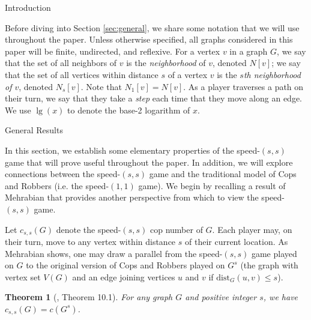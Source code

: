 \documentclass[12pt]{amsart}
\newcommand{\comment}[1]{\textcolor{red}{#1}}
\newtheorem{theorem}[lemma]{Theorem}
\theoremstyle{definition}
\newcommand{\speeds}{c_{s,s}}
\begin{document}
\begin{section}{Introduction}

Before diving into Section \ref{sec:general}, we share some notation that we will use throughout the paper.  Unless otherwise specified, all graphs considered in this paper will be finite, undirected, and reflexive.  For a vertex $v$ in a graph $G$, we say that the set of all neighbors of $v$ is the \textit{neighborhood} of $v$, denoted $N[v]$; we say that the set of all vertices within distance $s$ of a vertex $v$ is the \textit{$s$th neighborhood of $v$}, denoted $N_s[v]$.  Note that $N_1[v]=N[v]$.  As a player traverses a path on their turn, we say that they take a \textit{step} each time that they move along an edge.  We use $\lg(x)$ to denote the base-2 logarithm of $x$.  



\begin{section}{General Results}\label{sec:general}

In this section, we establish some elementary properties of the speed-$(s,s)$ game that will prove useful throughout the paper.  In addition, we will explore connections between the speed-$(s,s)$ game and the traditional model of Cops and Robbers (i.e. the speed-$(1,1)$ game).  We begin by recalling a result of Mehrabian \cite{MehThesis} that provides another perspective from which to view the speed-$(s,s)$ game. 

Let $\speeds(G)$ denote the speed-$(s,s)$ cop number of $G$.  Each player may, on their turn, move to any vertex within distance $s$ of their current location.  As Mehrabian shows, one may draw a parallel from the speed-$(s,s)$ game played on $G$ to the original version of Cops and Robbers played on $G^s$ (the graph with vertex set $V(G)$ and an edge joining vertices $u$ and $v$ if $\textrm{dist}_G(u,v) \le s$).

\begin{theorem}[\cite{MehThesis}, Theorem 10.1]\label{thm:graphpower}
For any graph $G$ and positive integer $s$, we have $\speeds(G) = c(G^s)$.
\end{theorem}


\end{section}
\end{section}
\end{document}

